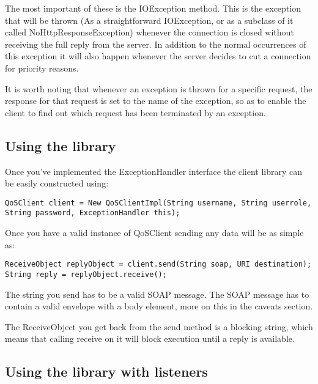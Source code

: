     The most important of these is the IOException method. This is the exception that will be thrown (As a straightforward IOException, or as a subclass of it called NoHttpResponseException) whenever the connection is closed without receiving the full reply from the server. In addition to the normal occurrences of this exception it will also happen whenever the server decides to cut a connection for priority reasons.

    It is worth noting that whenever an exception is thrown for a specific request, the response for that request is set to the name of the exception, so as to enable the client to find out which request has been terminated by an exception.

\subsection{Using the library}\label{userguideUsingLibrary}
    
    Once you’ve implemented the ExceptionHandler interface the client library can be easily constructed using:

\begin{lstlisting}[caption={Constructing the library}, label=userguideConstruction]
QoSClient client = New QoSClientImpl(String username, String userrole, String password, ExceptionHandler this);
\end{lstlisting}

Once you have a valid instance of QoSClient sending any data will be as simple as:

\begin{lstlisting}[caption={Sending data}, label=userguideSenddata]
ReceiveObject replyObject = client.send(String soap, URI destination);
String reply = replyObject.receive();
\end{lstlisting}

    The string you send has to be a valid SOAP message. The SOAP message has to contain a valid envelope with a body element, more on this in the caveats section.
    
    The ReceiveObject you get back from the send method is a blocking string, which means that calling receive on it will block execution until a reply is available.

\subsection{Using the library with listeners}\label{userguideUsingLibraryWithListeners}
    
